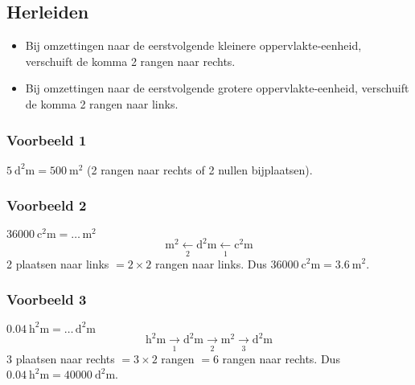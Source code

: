 \documentclass[a4paper,12pt]{article}
\begin{document}
\subsection{Herleiden}
\begin{itemize}
  \item Bij omzettingen naar de eerstvolgende kleinere oppervlakte-eenheid, verschuift de komma 2 rangen naar rechts.
  \item Bij omzettingen naar de eerstvolgende grotere oppervlakte-eenheid, verschuift de komma 2 rangen naar links.
\end{itemize}

\subsubsection*{Voorbeeld 1} \(\SI{5}{\square\deca\metre}=\SI{500}{\square\metre}\) (2 rangen naar rechts of 2 nullen bijplaatsen).

\subsubsection*{Voorbeeld 2} \(\SI{36000}{\square\centi\metre}=\ldots\,\si{\square\metre}\)
\[
\si{\square\metre} \xleftarrow[2]{}\si{\square\deci\metre} \xleftarrow[1]{}\si{\square\centi\metre}
\]
2 plaatsen naar links \(=2\times2\) rangen naar links. Dus \(\SI{36000}{\square\centi\metre}=\SI{3.6}{\square\metre}\).

\subsubsection*{Voorbeeld 3} \(\SI{0.04}{\square\hecto\metre}=\ldots\,\si{\square\deci\metre}\)
\[
\si{\square\hecto\metre} \xrightarrow[1]{}\si{\square\deca\metre} \xrightarrow[2]{}\si{\square\metre} \xrightarrow[3]{}\si{\square\deci\metre}
\]
3 plaatsen naar rechts \(=3\times2\) rangen \(=6\) rangen naar rechts. Dus \(\SI{0.04}{\square\hecto\metre}=\SI{40000}{\square\deci\metre}\).
\end{document}
